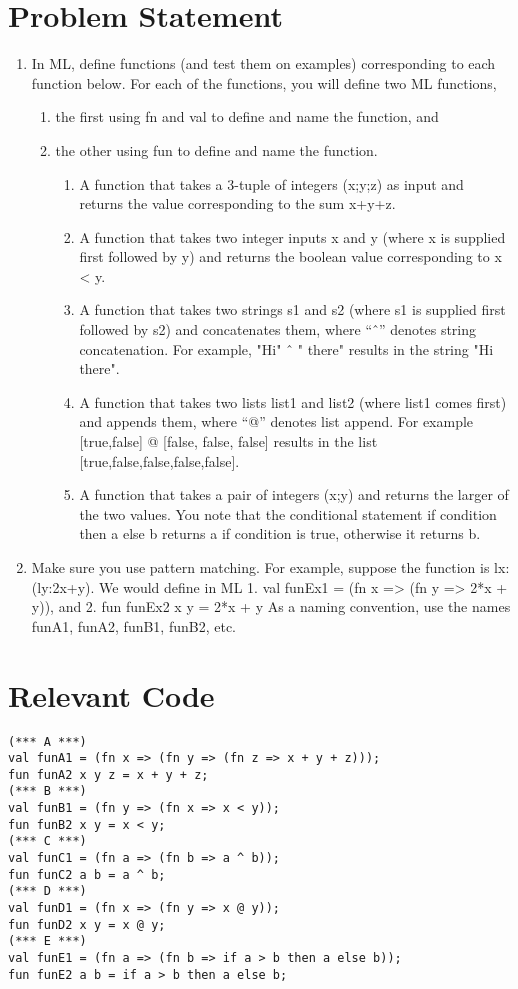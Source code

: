 \documentclass[twoside]{report}
\begin{document}
\section{Problem Statement}
\begin{enumerate}
    \item In ML, define functions (and test them on examples) corresponding to each function below. For each of the functions, you will define two ML functions,
    \begin{enumerate}
        \item the first using fn and val to define and name the function, and 
        \item the other using fun to define and name the function. 
        \begin{enumerate}
            \item A function that takes a 3-tuple of integers (x;y;z) as input and returns the value corresponding to the sum x+y+z.
            \item A function that takes two integer inputs x and y (where x is supplied first followed by y) and returns the boolean value corresponding to x < y.
            \item A function that takes two strings s1 and s2 (where s1 is supplied first followed by s2) and concatenates them, where “ˆ” denotes string concatenation. For example, "Hi" ˆ " there" results in the string "Hi there".
            \item A function that takes two lists list1 and list2 (where list1 comes first) and appends them, where “@” denotes list append. For example [true,false] @ [false, false, false] results in the list [true,false,false,false,false].
            \item A function that takes a pair of integers (x;y) and returns the larger of the two values. You note that the conditional statement if condition then a else b returns a if condition is true, otherwise it returns b.
        \end{enumerate}
    \end{enumerate}
    \item Make sure you use pattern matching. For example, suppose the function is lx:(ly:2x+y). We would define in ML 1. val funEx1 = (fn x => (fn y => 2*x + y)), and 2. fun funEx2 x y = 2*x + y As a naming convention, use the names funA1, funA2, funB1, funB2, etc.
\end{enumerate}
\section{Relevant Code}
    \begin{lstlisting}[frame=trBL]
(*** A ***)
val funA1 = (fn x => (fn y => (fn z => x + y + z)));
fun funA2 x y z = x + y + z;
(*** B ***)
val funB1 = (fn y => (fn x => x < y));
fun funB2 x y = x < y;
(*** C ***)
val funC1 = (fn a => (fn b => a ^ b));
fun funC2 a b = a ^ b;
(*** D ***)
val funD1 = (fn x => (fn y => x @ y));
fun funD2 x y = x @ y;
(*** E ***)
val funE1 = (fn a => (fn b => if a > b then a else b));
fun funE2 a b = if a > b then a else b;
    \end{lstlisting}
\end{document}

